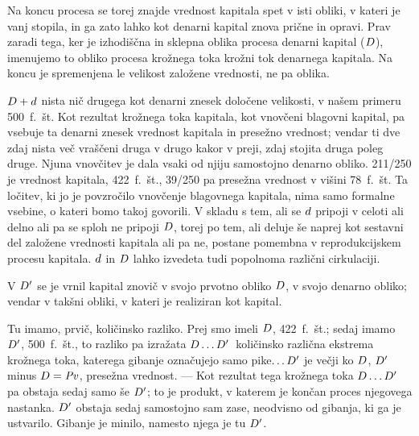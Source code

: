 \documentclass[kapital_02.tex]{subfiles}
\begin{document}
Na koncu procesa se torej znajde vrednost kapitala spet v isti obliki, v kateri je vanj stopila, in ga zato lahko kot denarni kapital znova prične in opravi. Prav zaradi tega, ker je izhodiščna in sklepna oblika procesa denarni kapital (\(D\)), imenujemo to obliko procesa krožnega toka krožni tok denarnega kapitala. Na koncu je spremenjena le velikost založene vrednosti, ne pa oblika.

\(D + d\) nista nič drugega kot denarni znesek določene velikosti, v našem primeru 500~f.~št. Kot rezultat krožnega toka kapitala, kot vnovčeni blagovni kapital, pa vsebuje ta denarni znesek vrednost kapitala in presežno vrednost; vendar ti dve zdaj nista več vraščeni druga v drugo kakor v preji, zdaj stojita druga poleg druge. Njuna vnovčitev je dala vsaki od njiju samostojno denarno obliko. 211/250 je vrednost kapitala, 422~f.~št., 39/250 pa presežna vrednost v višini 78~f.~št. Ta ločitev, ki jo je povzročilo vnovčenje blagovnega kapitala, nima samo formalne vsebine, o kateri bomo takoj govorili. V skladu s tem, ali se \(d\) pripoji v celoti ali delno ali pa se sploh ne pripoji \(D\), torej po tem, ali deluje še naprej kot sestavni del založene vrednosti kapitala ali pa ne, postane pomembna v reprodukcijskem procesu kapitala. \(d\) in \(D\) lahko izvedeta tudi popolnoma različni cirkulaciji.

V \(D'\) se je vrnil kapital znovič v svojo prvotno obliko \(D\), v svojo denarno obliko; vendar v takšni obliki, v kateri je realiziran kot kapital.

Tu imamo, prvič, količinsko razliko. Prej smo imeli \(D\), 422~f.~št.; sedaj imamo \(D'\), 500~f.~št., to razliko pa izražata \(D\dots D'\)\KPEstran\, količinsko različna ekstrema krožnega toka, katerega gibanje označujejo samo pike\(\dots D'\) je večji ko \(D\), \(D'\) minus \(D = \mathit{Pv}\), presežna vrednost. --- Kot rezultat tega krožnega toka \(D\dots D'\) pa obstaja sedaj samo še \(D'\); to je produkt, v katerem je končan proces njegovega nastanka. \(D'\) obstaja sedaj samostojno sam zase, neodvisno od gibanja, ki ga je ustvarilo. Gibanje je minilo, namesto njega je tu \(D'\).
\end{document}
